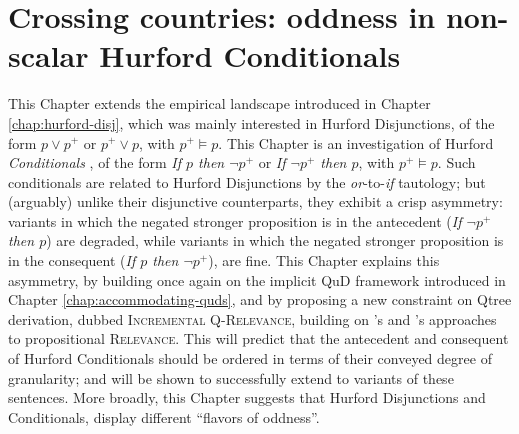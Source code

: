 \chapter[Crossing countries: oddness in non-scalar Hurford Conditionals]{Crossing countries: oddness in non-scalar Hurford Conditionals\footnotemark}\label{chap:hurford-sentences}

This Chapter extends the empirical landscape introduced in Chapter \ref{chap:hurford-disj}, which was mainly interested in Hurford Disjunctions, of the form $p \vee p^+$ or $p^+ \vee p$, with $p^+ \vDash p$. This Chapter is an investigation of Hurford \textit{Conditionals} \citep{Mandelkern2018,Kalomoiros2024}, of the form \textit{If $p$ then $\neg p^+$} or \textit{If $\neg p^+$ then $p$}, with $p^+ \vDash p$. Such conditionals are related to Hurford Disjunctions by the \textit{or}-to-\textit{if} tautology; but (arguably) unlike their disjunctive counterparts, they exhibit a crisp asymmetry: variants in which the negated stronger proposition is in the antecedent (\textit{If $\neg p^+$ then $p$}) are degraded, while variants in which the negated stronger proposition is in the consequent (\textit{If $p$ then $\neg p^+$}), are fine. This Chapter explains this asymmetry, by building once again on the implicit QuD framework introduced in Chapter \ref{chap:accommodating-quds}, and by proposing a new constraint on Qtree derivation, dubbed \textsc{Incremental Q-Relevance}, building on \citeauthor{Lewis1988}'s and \citeauthor{Roberts2012}'s approaches to propositional \textsc{Relevance}. This will predict that the antecedent and consequent of Hurford Conditionals should be ordered in terms of their conveyed degree of granularity; and will be shown to successfully extend to variants of these sentences. More broadly, this Chapter suggests that Hurford Disjunctions and Conditionals, display different ``flavors of oddness''.




